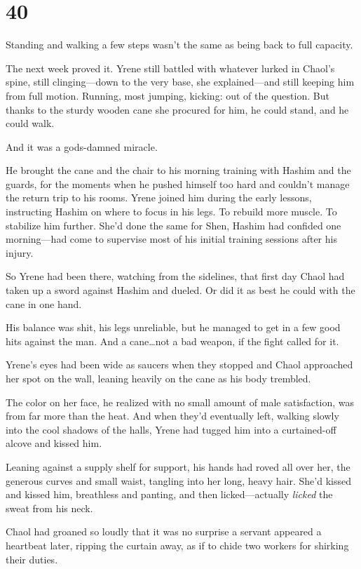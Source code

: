 
\chapter{40}

Standing and walking a few steps wasn't the same as being back to full capacity.

The next week proved it.
Yrene still battled with whatever lurked in Chaol's spine, still clinging---down to the very base, she explained---and still keeping him from full motion.
Running, most jumping, kicking: out of the question.
But thanks to the sturdy wooden cane she procured for him, he could stand, and he could walk.

And it was a gods-damned miracle.

He brought the cane and the chair to his morning training with Hashim and the guards, for the moments when he pushed himself too hard and couldn't manage the return trip to his rooms.
Yrene joined him during the early lessons, instructing Hashim on where to focus in his legs.
To rebuild more muscle.
To stabilize him further.
She'd done the same for Shen, Hashim had confided one morning---had come to supervise most of his initial training sessions after his injury.

So Yrene had been there, watching from the sidelines, that first day Chaol had taken up a sword against Hashim and dueled.
Or did it as best he could with the cane in one hand.

His balance was shit, his legs unreliable, but he managed to get in a few good hits against the man.
And a cane\ldots not a bad weapon, if the fight called for it.

Yrene's eyes had been wide as saucers when they stopped and Chaol approached her spot on the wall, leaning heavily on the cane as his body trembled.

The color on her face, he realized with no small amount of male satisfaction, was from far more than the heat.
And when they'd eventually left, walking slowly into the cool shadows of the halls, Yrene had tugged him into a curtained-off alcove and kissed him.

Leaning against a supply shelf for support, his hands had roved all over her, the generous curves and small waist, tangling into her long, heavy hair.
She'd kissed and kissed him, breathless and panting, and then licked---actually \emph{licked} the sweat from his neck.

Chaol had groaned so loudly that it was no surprise a servant appeared a heartbeat later, ripping the curtain away, as if to chide two workers for shirking their duties.

